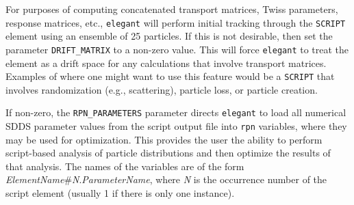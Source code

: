 For purposes of computing concatenated transport matrices, Twiss
parameters, response matrices, etc., {\tt elegant} will perform
initial tracking through the \verb|SCRIPT| element using an ensemble
of 25 particles.  If this is not desirable, then set the parameter
\verb|DRIFT_MATRIX| to a non-zero value.  This will force
\verb|elegant| to treat the element as a drift space for any
calculations that involve transport matrices.  Examples of where one
might want to use this feature would be a \verb|SCRIPT| that involves
randomization (e.g., scattering), particle loss, or particle creation.

If non-zero, the \verb|RPN_PARAMETERS| parameter directs \verb|elegant| to load all numerical
SDDS parameter values from the script output file into \verb|rpn| variables, where they may be used for
optimization. This provides the user the ability to perform script-based analysis of particle distributions and
then optimize the results of that analysis.
The names of the variables are of the form {\em ElementName}\#{\em N}.{\em ParameterName}, where
{\em N} is the occurrence number of the script element (usually 1 if there is only one instance).

